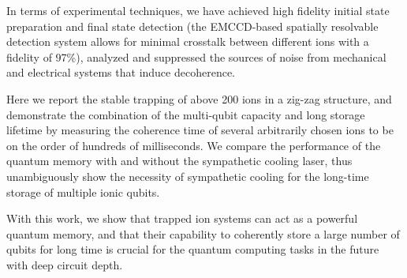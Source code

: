 \begin{abstract*}
  In terms of experimental techniques, we have achieved high fidelity initial state preparation and final state detection (the EMCCD-based spatially resolvable detection system allows for minimal crosstalk between different ions with a fidelity of 97\%), analyzed and suppressed the sources of noise from mechanical and electrical systems that induce decoherence.

  Here we report the stable trapping of above 200 ions in a zig-zag structure, and demonstrate the combination of the multi-qubit capacity and long storage lifetime by measuring the coherence time of several arbitrarily chosen ions to be on the order of hundreds of milliseconds. We compare the performance of the quantum memory with and without the sympathetic cooling laser, thus unambiguously show the necessity of sympathetic cooling for the long-time storage of multiple ionic qubits.

  With this work, we show that trapped ion systems can act as a powerful quantum memory, and that their capability to coherently store a large number of qubits for long time is crucial for the quantum computing tasks in the future with deep circuit depth.

\end{abstract*}
